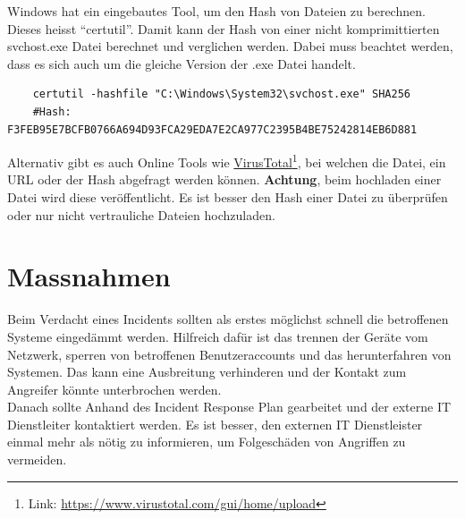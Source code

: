 Windows hat ein eingebautes Tool, um den Hash von Dateien zu berechnen.
Dieses heisst ``certutil''.
Damit kann der Hash von einer nicht komprimittierten svchost.exe Datei berechnet und verglichen werden.
Dabei muss beachtet werden, dass es sich auch um die gleiche Version der .exe Datei handelt.

\begin{lstlisting}
    certutil -hashfile "C:\Windows\System32\svchost.exe" SHA256
    #Hash: F3FEB95E7BCFB0766A694D93FCA29EDA7E2CA977C2395B4BE75242814EB6D881
\end{lstlisting}

Alternativ gibt es auch Online Tools wie \href{https://www.virustotal.com/gui/home/upload}{VirusTotal}\footnote{Link: \href{https://www.virustotal.com/gui/home/upload}{https://www.virustotal.com/gui/home/upload}}, bei welchen die Datei, ein URL oder der Hash abgefragt werden können.
\textbf{Achtung}, beim hochladen einer Datei wird diese veröffentlicht. 
Es ist besser den Hash einer Datei zu überprüfen oder nur nicht vertrauliche Dateien hochzuladen.

\section{Massnahmen}
Beim Verdacht eines Incidents sollten als erstes möglichst schnell die betroffenen Systeme eingedämmt werden. 
Hilfreich dafür ist das trennen der Geräte vom Netzwerk, sperren von betroffenen Benutzeraccounts und das herunterfahren von Systemen.
Das kann eine Ausbreitung verhinderen und der Kontakt zum Angreifer könnte unterbrochen werden.\\

Danach sollte Anhand des Incident Response Plan gearbeitet und der externe IT Dienstleiter kontaktiert werden.
Es ist besser, den externen IT Dienstleister einmal mehr als nötig zu informieren, um Folgeschäden von Angriffen zu vermeiden. 

